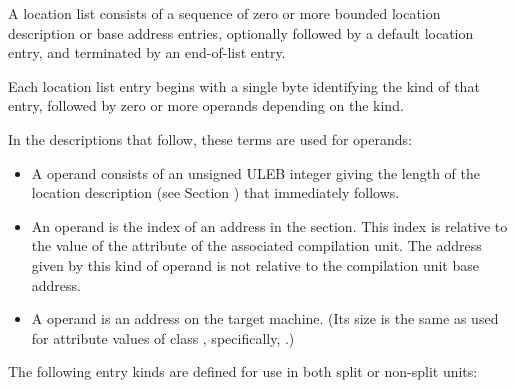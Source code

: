 A location list consists of a sequence of zero or more bounded
location description or base address entries, optionally followed
by a default location entry, and terminated by an end-of-list
entry.

Each location list entry begins with a single byte identifying
the kind of that entry, followed by zero or more operands depending
on the kind.   
   
In the descriptions that follow, these terms are used for operands:
   
\begin{itemize}
\item A  operand consists of
an unsigned ULEB integer giving the length of the location
description (see Section ) 
that immediately follows.

\item An  operand is the index of an address
in the \dotdebugaddr{} section. This index is relative to the
value of the \DWATaddrbase{} attribute of the associated
compilation unit. The address given by this kind
of operand is not relative to the compilation unit base address.
   
\item A  operand is an address on the target
machine. (Its size is the same as used for attribute values of
class \CLASSaddress, specifically, \DWFORMaddr.)

\end{itemize}
 
The following entry kinds are defined for use in both
split or non-split units:
   
